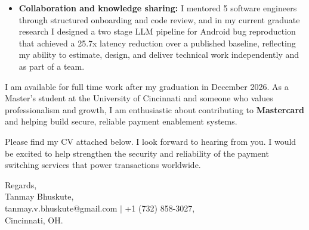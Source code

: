 \documentclass[11pt]{letter}
\begin{document}
\begin{letter}{}
\begin{itemize}[leftmargin=*, itemsep=0.45em]
    \item \textbf{Collaboration and knowledge sharing:} I mentored 5 software engineers through structured onboarding and code review, and in my current graduate research I designed a two stage LLM pipeline for Android bug reproduction that achieved a 25.7x latency reduction over a published baseline, reflecting my ability to estimate, design, and deliver technical work independently and as part of a team.
\end{itemize}

I am available for full time work after my graduation in December 2026. As a Master's student at the University of Cincinnati and someone who values professionalism and growth, I am enthusiastic about contributing to \textbf{Mastercard} and helping build secure, reliable payment enablement systems.

Please find my CV attached below. I look forward to hearing from you. I would be excited to help strengthen the security and reliability of the payment switching services that power transactions worldwide.

{\setlength{\parskip}{0pt}
Regards,\\
Tanmay Bhuskute,\\
tanmay.v.bhuskute@gmail.com $\mid$ +1 (732) 858-3027,\\
Cincinnati, OH.
}

\end{letter}
\end{document}
